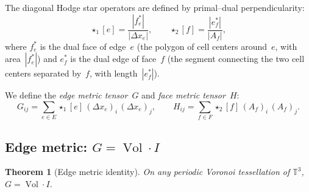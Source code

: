 \documentclass[preprint,12pt]{elsarticle}
\newtheorem{theorem}{Theorem}[section]
\DeclareMathOperator{\Vol}{Vol}
\begin{document}
The diagonal Hodge star operators are defined by primal--dual
perpendicularity:
\begin{equation}
  \star_1[e] = \frac{|f^*_e|}{|\Delta x_e|}, \qquad
  \star_2[f] = \frac{|e^*_f|}{|A_f|},
  \label{eq:hodge_stars}
\end{equation}
where $f^*_e$ is the dual face of edge~$e$ (the polygon of cell centers
around~$e$, with area~$|f^*_e|$) and $e^*_f$ is the dual edge of face~$f$
(the segment connecting the two cell centers separated by~$f$, with
length~$|e^*_f|$).

We define the \emph{edge metric tensor}~$G$ and \emph{face metric tensor}~$H$:
\begin{equation}
  G_{ij} = \sum_{e \in E} \star_1[e]\, (\Delta x_e)_i\, (\Delta x_e)_j,
  \qquad
  H_{ij} = \sum_{f \in F} \star_2[f]\, (A_f)_i\, (A_f)_j.
  \label{eq:GH_def}
\end{equation}

\subsection{Edge metric: $G = \Vol \cdot I$}
\label{sec:G_proof}

\begin{theorem}[Edge metric identity]
\label{thm:G}
On any periodic Voronoi tessellation of\/ $\mathbb{T}^3$,
$G = \Vol \cdot I$.
\end{theorem}
\end{document}
